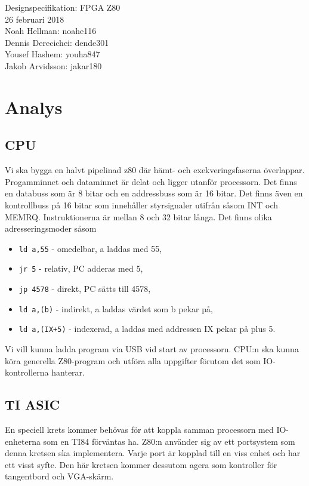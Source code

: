 \documentclass[12pt]{article}
\begin{document}
\begin{center}
\vspace*{15mm}
{\Huge Designspecifikation: FPGA Z80}\\
\vspace{15mm}
{\large 26 februari 2018}\\
\vspace{15mm}
Noah Hellman: noahe116 \\
Dennis Derecichei: dende301 \\
Yousef Hashem: youha847 \\
Jakob Arvidsson: jakar180 \\
\end{center}

\vspace{2cm}
\tableofcontents
\newpage

\section{Analys}
\subsection{CPU}
Vi ska bygga en halvt pipelinad z80 där hämt- och exekveringsfaserna
överlappar. Progamminnet och dataminnet är delat och ligger utanför processorn.
Det finns en databuss som är 8 bitar och en addressbuss som är 16 bitar. Det
finns även en kontrollbuss på 16 bitar som innehåller styrsignaler utifrån såsom
INT och MEMRQ. Instruktionerna är mellan 8 och 32 bitar långa. Det finns olika
adresseringsmoder såsom
\begin{itemize}
    \item \texttt{ld a,55} - omedelbar, a laddas med 55,
    \item \texttt{jr 5} - relativ, PC adderas med 5,
    \item \texttt{jp 4578} - direkt, PC sätts till 4578,
    \item \texttt{ld a,(b)} - indirekt, a laddas värdet som b pekar på,
    \item \texttt{ld a,(IX+5)} - indexerad, a laddas med addressen IX pekar på
        plus 5.
\end{itemize}
Vi vill kunna ladda program via USB vid start av processorn. CPU:n ska kunna
köra generella Z80-program och utföra alla uppgifter förutom det som
IO-kontrollerna hanterar.

\subsection{TI ASIC}
En speciell krets kommer behövas för att koppla samman processorn med
IO-enheterna som en TI84 förväntas ha. Z80:n använder sig av ett portsystem som
denna kretsen ska implementera. Varje port är kopplad till en viss enhet och
har ett visst syfte.  Den här kretsen kommer dessutom agera som kontroller för
tangentbord och VGA-skärm.
\end{document}
